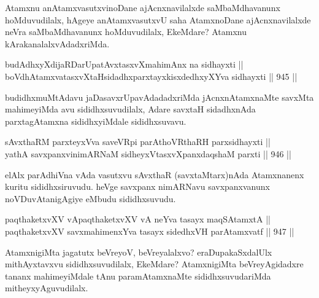 \begin{artha}
Atamxnu anAtamxvasutxvinoDane ajAcnxnavilalxde saMbaMdhavanunx hoMduvudilalx, hAgeye anAtamxvasutxvU saha AtamxnoDane ajAcnxnavilalxde neVra saMbaMdhavanunx hoMduvudilalx, EkeMdare? Atamxnu kArakanalalxvAdadxriMda.
\end{artha}


\begin{shl}
\footnotemark[1]budAdhxyXdijaRDarUpatAvxtasxvXmahimAnx na sidhayxti || \\
boVdhAtamxvatasxvXtaHsidadhxparxtayxkisxdedhxyXYva sidhayxti \hfill || 945 ||  
\end{shl}

\begin{artha}
budidhxmuMtAdavu jaDasavxrUpavAdadadxriMda jAcnxnAtamxnaMte savxMta mahimeyiMda avu sididhxsuvudilalx, Adare savxtaH sidadhxnAda parxtagAtamxna sididhxyiMdale sididhxsuvavu.
\end{artha}


\begin{shl}
sAvxthaRM parxteyxVva saveVR\s pi parAthoVR\s thaRH parxsidhayxti || \\
yathA savxpanxvinimARNaM sidheyxVtasxvXpanxdaqshaM parxti \hfill || 946 ||  
\end{shl}

\begin{artha}
elAlx parAdhiVna vAda vasutxvu sAvxthaR (savxtaMtarx)nAda Atamxnanenx kuritu sididhxsiruvudu. heVge savxpanx nimARNavu savxpanxvanunx noVDuvAtanigAgiye eMbudu sididhxsuvudu.
\end{artha}


\begin{shl}
paqthaketxvXV vA\s paqthaketxvXV vA neYva tasayx maqSAtamxtA || \\
paqthaketxvXV savxmahimenxYva tasayx sidedhxVH parAtamxvatf \hfill || 947 ||  
\end{shl}

\begin{artha}
AtamxnigiMta jagatutx beVreyoV, beVreyalalxvo? eraDupakaSxdalUlx mithAyxtavxvu sididhxsuvudilalx, EkeMdare? AtamxnigiMta beVreyAgidadxre tananx mahimeyiMdale tAnu paramAtamxnaMte sididhxsuvudariMda mitheyxyAguvudilalx.
\end{artha}

